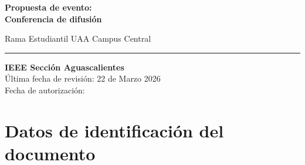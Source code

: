 \documentclass[11pt,a4paper]{article}
\begin{document}
\color{textBrown}

\pagestyle{empty}

\vspace{1.5cm}

\logos
\vspace{3cm}

{\fontsize{36}{42}\selectfont\bfseries\color{titleBrown} Propuesta de evento:\\ Conferencia de difusión}

\vspace{0.8cm}

{\large Rama Estudiantil UAA Campus Central}

\vspace{0.3cm}

\noindent\rule{7.5cm}{0.5pt}

\vfill

{\color{sectionTeal}\bfseries IEEE Sección Aguascalientes}\\[0.2cm]
Última fecha de revisión: 22 de Marzo 2026\\[0.1cm]
Fecha de autorización:

\newpage

\pagestyle{fancy}
\fancyhf{}
\renewcommand{\headrulewidth}{0pt}
\fancyfoot[C]{\thepage}

\vspace{0.5cm}

\section{Datos de identificación del documento}

\vspace{0.8cm}

\end{document}
